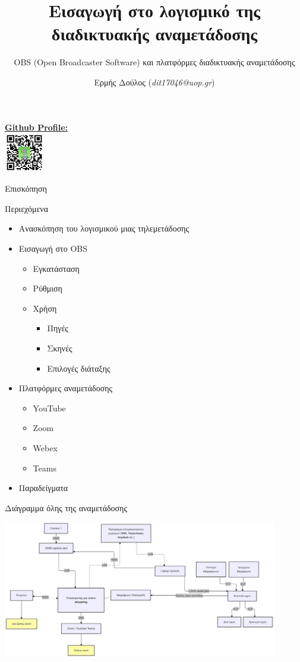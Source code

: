 \documentclass[aspectratio=169]{beamer}
\title{Εισαγωγή στο λογισμικό της διαδικτυακής αναμετάδοσης}
\subtitle{OBS (Open Broadcaster Software) και πλατφόρμες διαδικτυακής αναμετάδοσης}
\author{Ερμής Δούλος (\textit{dit17046@uop.gr})}
\begin{document}
\begin{frame}
  \titlepage
  \begin{center}
    \href{https://github.com/doblador42}{\textbf{Github Profile:}}\\
    \includegraphics[width=0.13\textwidth]{images/qrcode.png}
  \end{center}
\end{frame}


\begin{frame}{Επισκόπηση}
  \begin{block}{Περιεχόμενα}
\begin{itemize}
\item Ανασκόπηση του λογισμικού μιας τηλεμετάδοσης
\item Εισαγωγή στο OBS
\begin{itemize}
  \item Εγκατάσταση
  \item Ρύθμιση
  \item Χρήση
        \begin{itemize}
          \item Πηγές
          \item Σκηνές
          \item Επιλογές διάταξης
        \end{itemize}
\end{itemize}
\item Πλατφόρμες αναμετάδοσης
\begin{itemize}
  \item YouTube
  \item Zoom
  \item Webex
  \item Teams
\end{itemize}
\item Παραδείγματα
\end{itemize}
\end{block}
\end{frame}
\begin{frame}{Διάγραμμα όλης της αναμετάδοσης}
  \begin{center}
    \includegraphics[width=0.9\textwidth]{images/diagram.png}
  \end{center}
\end{frame}
\end{document}
